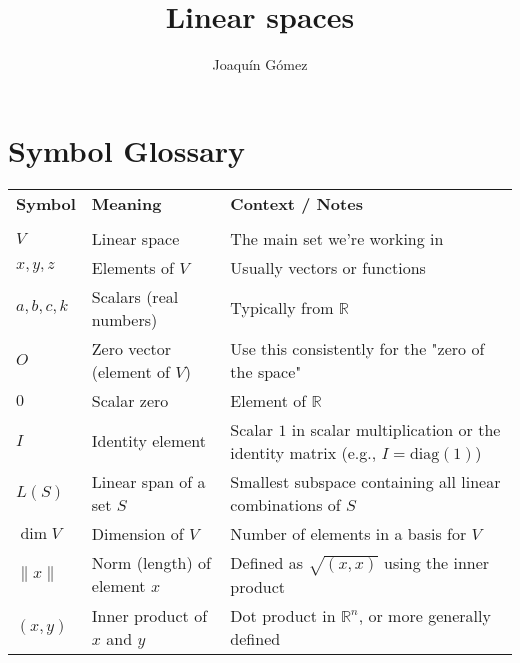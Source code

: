 \documentclass{book}
\title{Linear spaces}
\author{Joaquín Gómez}
\begin{document}
\frontmatter
\maketitle
\tableofcontents
\section*{Symbol Glossary}

\begin{tabular}{@{}llp{8.5cm}@{}}
    \textbf{Symbol}     & \textbf{Meaning}             & \textbf{Context / Notes}                                                                \\
    \\[-0.8em] %
    $V$                 & Linear space                 & The main set we're working in                                                           \\
    $x, y, z$           & Elements of $V$              & Usually vectors or functions                                                            \\
    $a, b, c, k$           & Scalars (real numbers)       & Typically from $\mathbb{R}$                                                             \\
    $O$                 & Zero vector (element of $V$) & Use this consistently for the "zero of the space"                                       \\
    $0$                 & Scalar zero                  & Element of $\mathbb{R}$                                                                 \\
    $I$                 & Identity element             & Scalar $1$ in scalar multiplication or the identity matrix (e.g., $I = \text{diag}(1)$) \\
    $L(S)$              & Linear span of a set $S$     & Smallest subspace containing all linear combinations of $S$                             \\
    $\dim V$            & Dimension of $V$             & Number of elements in a basis for $V$                                                   \\
    $\|x\|$             & Norm (length) of element $x$ & Defined as $\sqrt{(x, x)}$ using the inner product                                      \\
    $(x, y)$            & Inner product of $x$ and $y$ & Dot product in $\mathbb{R}^n$, or more generally defined                                \\

\end{tabular}
\end{document}
